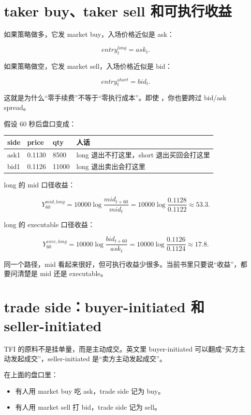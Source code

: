 \section{taker buy、taker sell 和可执行收益}

如果策略做多，它发 market buy，入场价格近似是 ask：

\[
entry^{long}_t = ask_t.
\]

如果策略做空，它发 market sell，入场价格近似是 bid：

\[
entry^{short}_t = bid_t.
\]

这就是为什么“零手续费”不等于“零执行成本”。即使 ，你也要跨过 bid/ask spread。

假设 60 秒后盘口变成：

\begin{longtable}{p{}p{}p{}p{}}
\toprule
side & price & qty & 人话 \\
\midrule
ask1 & 0.1130 & 8500 & long 退出不打这里，short 退出买回会打这里 \\
bid1 & 0.1126 & 11000 & long 退出卖出会打这里 \\
\bottomrule
\end{longtable}

long 的 mid 口径收益：

\[
Y^{mid,long}_{60}
=10000\log\frac{mid_{t+60}}{mid_t}
=10000\log\frac{0.1128}{0.1122}
\approx53.3.
\]

long 的 executable 口径收益：

\[
Y^{exec,long}_{60}
=10000\log\frac{bid_{t+60}}{ask_t}
=10000\log\frac{0.1126}{0.1124}
\approx17.8.
\]

同一个路径，mid 看起来很好，但可执行收益少很多。当前书里只要说“收益”，都要问清楚是 mid 还是 executable。

\section{trade side：buyer-initiated 和 seller-initiated}

TFI 的原料不是挂单量，而是主动成交。英文里 buyer-initiated 可以翻成“买方主动发起成交”，seller-initiated 是“卖方主动发起成交”。

在上面的盘口里：

\begin{itemize}[leftmargin=2em]
  \item 有人用 market buy 吃 ask，trade side 记为 buy。
  \item 有人用 market sell 打 bid，trade side 记为 sell。
\end{itemize}


